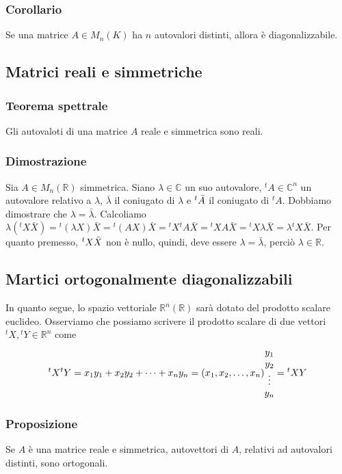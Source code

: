 \documentclass[../main.tex]{subfiles}
\begin{document}
\subsubsection{Corollario}
Se una matrice $A\in M_n(K)$ ha $n$ autovalori distinti, allora è
diagonalizzabile.

\subsection{Matrici reali e simmetriche}

\subsubsection{Teorema spettrale}
Gli autovaloti di una matrice $A$ reale e simmetrica sono reali.

\subsubsection{Dimostrazione}
Sia $A\in M_n(\mathbb{R})$ simmetrica. Siano $\lambda\in \mathbb{C}$ un suo
autovalore, ${^{t}A}\in\mathbb{C}^n$ un autovalore relativo a $\lambda$,
$\bar{\lambda}$ il coniugato di $\lambda$ e ${^{t}\Bar{A}}$ il coniugato di
${^{t}A}$. Dobbiamo dimostrare che $\lambda = \bar{\lambda}$. Calcoliamo
$\lambda({^{t}X}\bar{X}) = {^{t}(\lambda X)}\bar{X} = {^{t}(AX)}\bar{X} =
    {^{t}X}{^{t}A}\bar{X} = {^{t}X}A\bar{X} = {^{t}X}\lambda\bar{X} =
    \lambda{^{t}X}\bar{X}$. Per quanto premesso, ${^{t}X}\Bar{X}$ non è nullo,
quindi, deve essere $\lambda = \bar{\lambda}$, perciò $\lambda\in\mathbb{R}$.

\subsection{Martici ortogonalmente diagonalizzabili}
In quanto segue, lo spazio vettoriale $\mathbb{R}^n (\mathbb{R})$ sarà dotato
del prodotto scalare euclideo. Osserviamo che possiamo scrivere il prodotto
scalare di due vettori ${^{t}X}, {^{t}Y}\in\mathbb{R}^n$ come
\[
    {^{t}X}{^{t}Y} = x_1y_1 + x_2y_2 + \cdots + x_ny_n = (x_1, x_2, \ldots, x_{n})\begin{matrix}
        y_1    \\
        y_2    \\
        \vdots \\
        y_n
    \end{matrix} = {^{t}X}Y
\]

\subsubsection{Proposizione}
Se $A$ è una matrice reale e simmetrica, autovettori di $A$, relativi ad
autovalori distinti, sono ortogonali.
\end{document}
